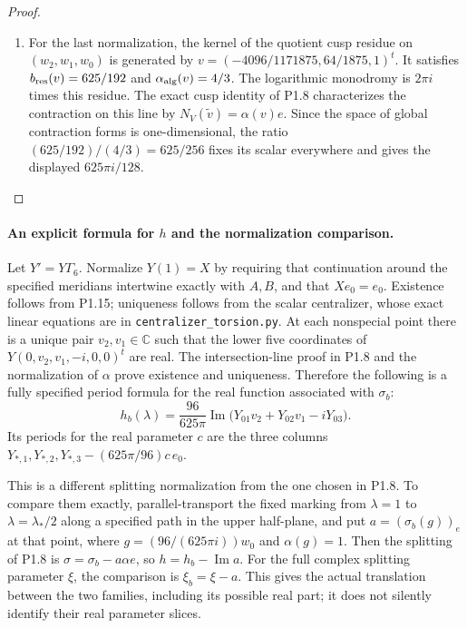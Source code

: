 \begin{proof}
\begin{enumerate}[label=\arabic*.]
\item For the last normalization, the kernel of the quotient cusp residue
on $(w_2,w_1,w_0)$ is generated by
$v=(-4096/1171875,64/1875,1)^t$.
It satisfies $b_{\rm res}(v)=625/192$ and
$\alpha_{\rm alg}(v)=4/3$.
The logarithmic monodromy is $2\pi i$ times this residue.
The exact cusp identity of P1.8 characterizes the contraction on this
line by $N_V(\widetilde v)=\alpha(v)e$.
Since the space of global contraction forms is one-dimensional, the
ratio $(625/192)/(4/3)=625/256$ fixes its scalar everywhere and gives
the displayed $625\pi i/128$.

\end{enumerate}
\end{proof}


\paragraph{An explicit formula for $h$ and the normalization comparison.}
Let $Y'=Y\Gamma_6$.  Normalize $Y(1)=X$ by requiring that continuation
around the specified meridians intertwine exactly with $A,B$, and that
$Xe_0=e_0$.  Existence follows from P1.15; uniqueness follows from the
scalar centralizer, whose exact linear equations are in
\texttt{centralizer\_torsion.py}.
At each nonspecial point there is a unique pair $v_2,v_1\in\mathbb C$
such that the lower five coordinates of
$Y(0,v_2,v_1,-i,0,0)^t$ are real.
The intersection-line proof in P1.8 and the normalization of $\alpha$
prove existence and uniqueness.  Therefore the following is a fully
specified period formula for the real function associated with
$\sigma_b$:
\[
h_b(\lambda)=\frac{96}{625\pi}
 \operatorname{Im}\bigl(Y_{01}v_2+Y_{02}v_1-iY_{03}\bigr).
\tag{1.15.3}
\]
Its periods for the real parameter $c$ are the three columns
$Y_{*,1},Y_{*,2},Y_{*,3}-(625\pi/96)c\,e_0$.

This is a different splitting normalization from the one chosen in
P1.8.  To compare them exactly, parallel-transport the fixed marking
from $\lambda=1$ to $\lambda=\lambda_*/2$ along a specified path in the
upper half-plane, and put
$a=(\sigma_b(g))_e$ at that point, where
$g=(96/(625\pi i))w_0$ and $\alpha(g)=1$.
Then the splitting of P1.8 is
$\sigma=\sigma_b-a\alpha e$, so $h=h_b-\operatorname{Im}a$.
For the full complex splitting parameter $\xi$, the comparison is
$\xi_b=\xi-a$.  This gives the actual translation between the two
families, including its possible real part; it does not silently
identify their real parameter slices.



